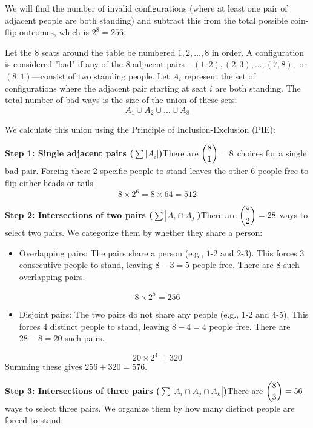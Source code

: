 \begin{enumerate}
We will find the number of invalid configurations (where at least one pair of adjacent people are both standing) and subtract this from the total possible coin-flip outcomes, which is $2^8 = 256$.

 Let the 8 seats around the table be numbered $1, 2, \dots, 8$ in order. A configuration is considered "bad" if any of the 8 adjacent pairs—$(1,2), (2,3), \dots, (7,8),$ or $(8,1)$—consist of two standing people. Let $A_i$ represent the set of configurations where the adjacent pair starting at seat $i$ are both standing. The total number of bad ways is the size of the union of these sets:
 \[|A_1 \cup A_2 \cup \dots \cup A_8|\]

 We calculate this union using the Principle of Inclusion-Exclusion (PIE):

 \textbf{Step 1: Single adjacent pairs ($\sum |A_i|$)}There are $\dbinom{8}{1} = 8$ choices for a single bad pair. Forcing these 2 specific people to stand leaves the other 6 people free to flip either heads or tails.
 \[8 \times 2^6 = 8 \times 64 = 512\]

 \textbf{Step 2: Intersections of two pairs ($\sum |A_i \cap A_j|$)}There are $\dbinom{8}{2} = 28$ ways to select two pairs. We categorize them by whether they share a person:

 
            \begin{itemize}
        \item Overlapping pairs: The pairs share a person (e.g., $1\text{-}2$ and $2\text{-}3$). This forces 3 consecutive people to stand, leaving $8 - 3 = 5$ people free. There are $8$ such overlapping pairs.
            \end{itemize}
            
 \[8 \times 2^5 = 256\]

            \begin{itemize}
        \item Disjoint pairs: The two pairs do not share any people (e.g., $1\text{-}2$ and $4\text{-}5$). This forces 4 distinct people to stand, leaving $8 - 4 = 4$ people free. There are $28 - 8 = 20$ such pairs.
            \end{itemize}
            
 \[20 \times 2^4 = 320\]Summing these gives $256 + 320 = 576$.

 \textbf{Step 3: Intersections of three pairs ($\sum |A_i \cap A_j \cap A_k|$)}There are $\dbinom{8}{3} = 56$ ways to select three pairs. We organize them by how many distinct people are forced to stand:


\end{enumerate}
